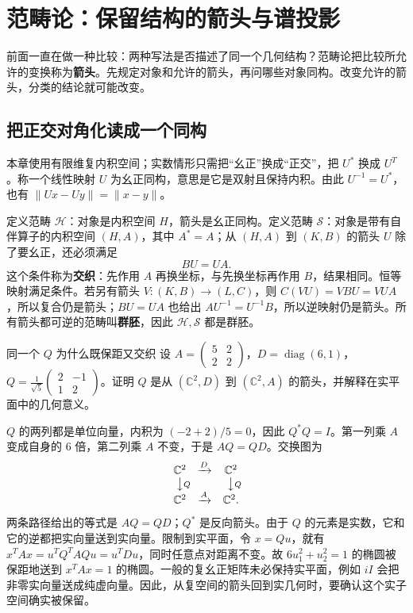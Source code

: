 \chapter{范畴论：保留结构的箭头与谱投影}
\label{chap:category}

前面一直在做一种比较：两种写法是否描述了同一个几何结构？范畴论把比较所允许的变换称为\textbf{箭头}。先规定对象和允许的箭头，再问哪些对象同构。改变允许的箭头，分类的结论就可能改变。

\section{把正交对角化读成一个同构}

本章使用有限维复内积空间；实数情形只需把“幺正”换成“正交”，把 $U^*$ 换成 $U^T$。称一个线性映射 $U$ 为幺正同构，意思是它是双射且保持内积。由此 $U^{-1}=U^*$，也有 $\|Ux-Uy\|=\|x-y\|$。

定义范畴 $\mathcal H$：对象是内积空间 $H$，箭头是幺正同构。定义范畴 $\mathcal S$：对象是带有自伴算子的内积空间 $(H,A)$，其中 $A^*=A$；从 $(H,A)$ 到 $(K,B)$ 的箭头 $U$ 除了要幺正，还必须满足
\[
 BU=UA.
\]
这个条件称为\textbf{交织}：先作用 $A$ 再换坐标，与先换坐标再作用 $B$，结果相同。恒等映射满足条件。若另有箭头 $V:(K,B)\to(L,C)$，则 $C(VU)=VBU=VUA$，所以复合仍是箭头；$BU=UA$ 也给出 $AU^{-1}=U^{-1}B$，所以逆映射仍是箭头。所有箭头都可逆的范畴叫\textbf{群胚}，因此 $\mathcal H,\mathcal S$ 都是群胚。

\begin{example}{同一个 $Q$ 为什么既保距又交织}
设 $A=\begin{pmatrix}5&2\\2&2\end{pmatrix}$，$D=\operatorname{diag}(6,1)$，$Q=\frac1{\sqrt5}\begin{pmatrix}2&-1\\1&2\end{pmatrix}$。证明 $Q$ 是从 $(\mathbb C^2,D)$ 到 $(\mathbb C^2,A)$ 的箭头，并解释在实平面中的几何意义。
\end{example}
\begin{solution}
$Q$ 的两列都是单位向量，内积为 $(-2+2)/5=0$，因此 $Q^*Q=I$。第一列乘 $A$ 变成自身的 $6$ 倍，第二列乘 $A$ 不变，于是 $AQ=QD$。交换图为
\[
\begin{array}{ccc}
 \mathbb C^2 &\xrightarrow{D}& \mathbb C^2\\
 \big\downarrow\rlap{$\scriptstyle Q$}&&\big\downarrow\rlap{$\scriptstyle Q$}\\
 \mathbb C^2 &\xrightarrow{A}& \mathbb C^2.
\end{array}
\]
两条路径给出的等式是 $AQ=QD$；$Q^*$ 是反向箭头。由于 $Q$ 的元素是实数，它和它的逆都把实向量送到实向量。限制到实平面，令 $x=Qu$，就有 $x^TAx=u^TQ^TAQu=u^TDu$，同时任意点对距离不变。故 $6u_1^2+u_2^2=1$ 的椭圆被保距地送到 $x^TAx=1$ 的椭圆。一般的复幺正矩阵未必保持实平面，例如 $iI$ 会把非零实向量送成纯虚向量。因此，从复空间的箭头回到实几何时，要确认这个实子空间确实被保留。
\end{solution}

